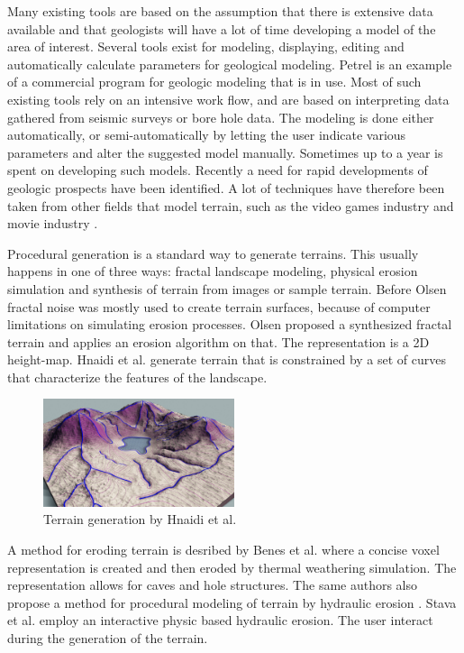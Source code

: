 \documentclass[a4paper,12pt]{report}
\begin{document}
Many existing tools are based on the assumption that there is extensive data available and that geologists will have a lot of time developing a model of the area of interest. Several tools exist for modeling, displaying, editing and automatically calculate parameters for geological modeling.  Petrel \cite{petrel} is an example of a commercial program for geologic modeling that is in use. Most of such existing tools rely on an intensive work flow, and are based on interpreting data gathered from seismic surveys or bore hole data. The modeling is done either automatically, or semi-automatically by letting the user indicate various parameters and alter the suggested model manually. Sometimes up to a year is spent on developing such models. Recently a need for rapid developments of geologic prospects have been identified. A lot of techniques have therefore been taken from other fields that model terrain, such as the video games industry and movie industry \cite{natali2013modeling}.

 Procedural generation is a standard way to generate terrains. This usually happens in one of three ways: fractal landscape modeling, physical erosion simulation and synthesis of terrain from images or sample terrain. Before Olsen \cite{olsen2004realtime} fractal noise was mostly used to create terrain surfaces, because of computer limitations on simulating erosion processes. Olsen proposed a synthesized fractal terrain and applies an erosion algorithm on that. The representation is a 2D height-map. Hnaidi et al. \cite{hnaidi2010feature} generate terrain that is constrained by a set of curves that characterize the features of the landscape.
 
 
\begin{figure}
 \centering
 \includegraphics[width=0.5\textwidth]{thesis/related/hnaidi.png}
 \caption{Terrain generation by Hnaidi et al. }
 \label{fig:hnaidi}
\end{figure}

 
 A method for eroding terrain is desribed by Benes et al. \cite{benes2001layered} where a concise voxel representation is created and then eroded by thermal weathering simulation. The representation allows for caves and hole structures. The same authors also propose a method for procedural modeling of terrain by hydraulic erosion \cite{benevs2002visual}. Stava et al. \cite{vst2008interactive} employ an interactive physic based hydraulic erosion. The user interact during the generation of the terrain.
 
\end{document}
